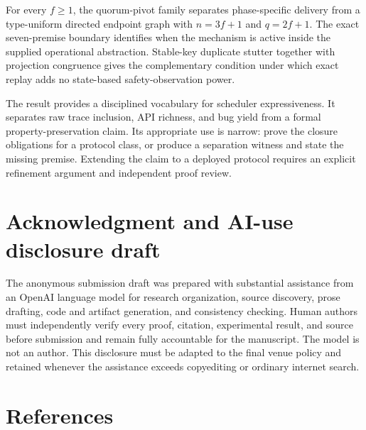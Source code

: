 \documentclass[10pt,a4paper]{article}
\begin{document}
For every \(f\geq1\), the quorum-pivot family separates phase-specific
delivery from a type-uniform directed endpoint graph with \(n=3f+1\) and
\(q=2f+1\). The exact seven-premise boundary identifies when the
mechanism is active inside the supplied operational abstraction.
Stable-key duplicate stutter together with projection congruence gives
the complementary condition under which exact replay adds no state-based
safety-observation power.

The result provides a disciplined vocabulary for scheduler
expressiveness. It separates raw trace inclusion, API richness, and bug
yield from a formal property-preservation claim. Its appropriate use is
narrow: prove the closure obligations for a protocol class, or produce a
separation witness and state the missing premise. Extending the claim to
a deployed protocol requires an explicit refinement argument and
independent proof review.

\section{Acknowledgment and AI-use disclosure
draft}\label{acknowledgment-and-ai-use-disclosure-draft}

The anonymous submission draft was prepared with substantial assistance
from an OpenAI language model for research organization, source
discovery, prose drafting, code and artifact generation, and consistency
checking. Human authors must independently verify every proof, citation,
experimental result, and source before submission and remain fully
accountable for the manuscript. The model is not an author. This
disclosure must be adapted to the final venue policy and retained
whenever the assistance exceeds copyediting or ordinary internet search.

\section*{References}\label{references}
\end{document}

